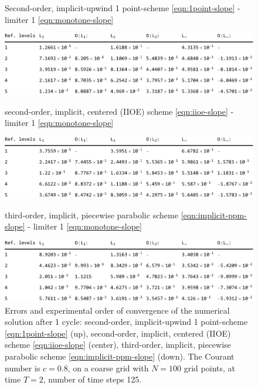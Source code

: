 \documentclass[../thesis.tex]{subfiles}
\begin{document}
\begin{figure}[H]
	\centering
    \caption*{Second-order, implicit-upwind 1 point-scheme \eqref{eqn:1point-slope} - limiter 1 \eqref{eqn:monotone-slope}}
	\includegraphics[width=\textwidth]{../tab/tab-1point-c0p8-T2-limit1-shu.pdf}
    \caption*{second-order, implicit, centered (IIOE) scheme \eqref{eqn:iioe-slope} - limiter 1 \eqref{eqn:monotone-slope}}
	\includegraphics[width=\textwidth]{../tab/tab-iioe-c0p8-T2-limit1-shu.pdf}
    \caption*{third-order, implicit, piecewise parabolic scheme \eqref{eqn:implicit-ppm-slope} - limiter 1 \eqref{eqn:monotone-slope}}
	\includegraphics[width=\textwidth]{../tab/tab-implicit-ppm-c0p8-T2-limit1-shu.pdf}
	\caption{Errors and experimental order of convergence of the numerical solution after 1 cycle: second-order, implicit-upwind 1 point-scheme \eqref{eqn:1point-slope} (up), second-order, implicit, centered (IIOE) scheme \eqref{eqn:iioe-slope} (center), third-order, implicit, piecewise parabolic scheme \eqref{eqn:implicit-ppm-slope} (down). The Courant number is \(c = 0.8\), on a coarse grid with \(N = 100\) grid points, at time \(T = 2\), number of time steps 125.}
	\label{tab:c0p8-T2-limit1-shu}
\end{figure}
\end{document}
